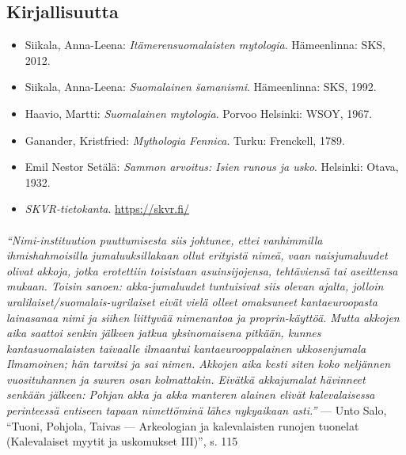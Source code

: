 \subsection{Kirjallisuutta}

  \begin{itemize}
    \item Siikala, Anna-Leena: \emph{Itämerensuomalaisten mytologia}. Hämeenlinna: SKS, 2012.
    \item Siikala, Anna-Leena: \emph{Suomalainen šamanismi}. Hämeenlinna: SKS, 1992.
    \item Haavio, Martti: \emph{Suomalainen mytologia}. Porvoo Helsinki: WSOY, 1967.
    \item Ganander, Kristfried: \emph{Mythologia Fennica}. Turku: Frenckell, 1789.
    \item Emil Nestor Setälä: \emph{Sammon arvoitus: Isien runous ja usko}. Helsinki: Otava, 1932.
    \item \emph{SKVR-tietokanta}. \url{https://skvr.fi/}
  \end{itemize}

  \paragraph{}
    {\small
      \emph{``Nimi-instituution puuttumisesta siis johtunee, ettei vanhimmilla ihmishahmoisilla
      jumaluuksillakaan ollut erityistä nimeä, vaan naisjumaluudet olivat akkoja, jotka erotettiin
      toisistaan asuinsijojensa, tehtäviensä tai aseittensa mukaan. Toisin sanoen: akka-jumaluudet
      tuntuisivat siis olevan ajalta, jolloin uralilaiset/suomalais-ugrilaiset eivät vielä olleet
      omaksuneet kantaeuroopasta lainasanaa nimi ja siihen liittyvää nimenantoa ja proprin-käyttöä.
      Mutta akkojen aika saattoi senkin jälkeen jatkua yksinomaisena pitkään, kunnes
      kantasuomalaisten taivaalle ilmaantui kantaeurooppalainen ukkosenjumala Ilmamoinen; hän
      tarvitsi ja sai nimen. Akkojen aika kesti siten koko neljännen vuosituhannen ja suuren osan
      kolmattakin. Eivätkä akkajumalat hävinneet senkään jälkeen: Pohjan akka ja akka manteren
      alainen elivät kalevalaisessa perinteessä entiseen tapaan nimettöminä lähes nykyaikaan
      asti.''} --- Unto Salo, ``Tuoni, Pohjola, Taivas --- Arkeologian ja kalevalaisten runojen
      tuonelat (Kalevalaiset myytit ja uskomukset III)'', s. 115
    }
